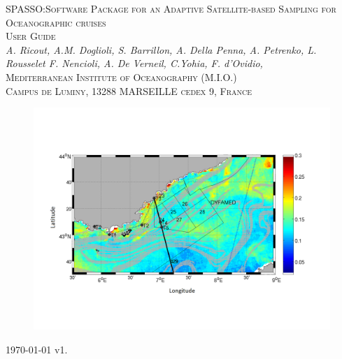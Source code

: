 \documentclass[12pt,a4paper]{article}
\begin{document}
\newcommand{\fig}[1]{Fig.#1}
\begin{titlepage}
\begin{center}

\textsc{\huge{SPASSO:Software Package for an Adaptive Satellite-based Sampling for Oceanographic cruises}}\\
\vspace{1\baselineskip}
\textsc{\LARGE{User Guide}}\\
\vspace{1\baselineskip}
\textit{{\large{A. Ricout, A.M. Doglioli, S. Barrillon, A. Della Penna, A. Petrenko, L. Rousselet F. Nencioli, A. De Verneil, C.Yohia, F. d'Ovidio,}}}\\ %
\vspace{1\baselineskip}
\textsc{\large{Mediterranean Institute of Oceanography (M.I.O.)}}\\
\textsc{\normalsize{Campus de Luminy, 13288 MARSEILLE cedex 9, France}}\\
\begin{figure}[h!]
\centerline{\includegraphics[scale=0.41]{Figures/20151023_d-OC_CNR-L3-CHL-MedOC3AD4_A_1KM-MED-NRT.png}}
\end{figure}
\vfill
\today{ v1.}
\end{center}
\end{titlepage}
\makeatother
\end{document}

